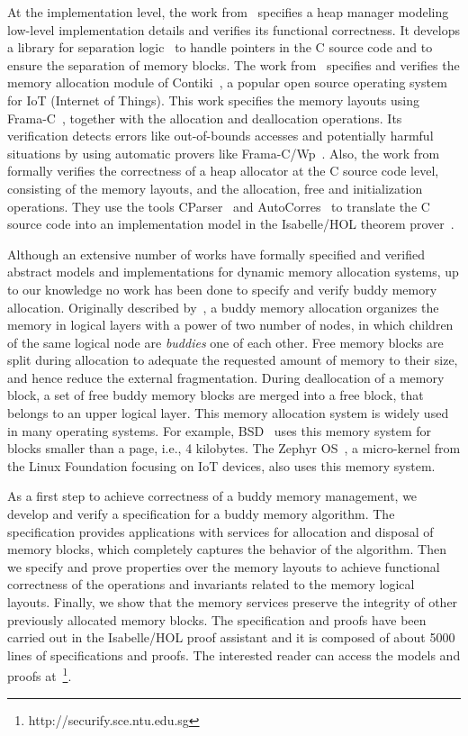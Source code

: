 At the implementation level, the work from~\cite{reg_marti} specifies a heap manager modeling low-level implementation details and verifies its functional correctness. It develops a library for separation logic~\cite{reg_reynolds} to handle pointers in the C source code and to ensure the separation of memory blocks. The work from~\cite{reg_mangano} specifies and verifies the memory allocation module of Contiki~\cite{reg_dunkers}, a popular open source operating system for IoT (Internet of Things). This work specifies the memory layouts using Frama-C~\cite{reg_kirchner}, together with the allocation and deallocation operations. Its verification detects errors like out-of-bounds accesses and potentially harmful situations by using automatic provers like Frama-C/Wp~\cite{reg_allan}. Also, the work from~\cite{reg_sahebolamri} formally verifies the correctness of a heap allocator at the C source code level, consisting of the memory layouts, and the allocation, free and initialization operations. They use the tools CParser~\cite{reg_tuch} and AutoCorres~\cite{reg_greenaway} to translate the C source code into an implementation model in the Isabelle/HOL theorem prover~\cite{reg_Isabelle/HOL}.

Although an extensive number of works have formally specified and verified abstract models and implementations for dynamic memory allocation systems, up to our knowledge no work has been done to specify and verify buddy memory allocation. Originally described by~\cite{reg_knowlton}, a buddy memory allocation organizes the memory in logical layers with a power of two number of nodes, in which children of the same logical node are \emph{buddies} one of each other. Free memory blocks are split during allocation to adequate the requested amount of memory to their size, and hence reduce the external fragmentation. During deallocation of a memory block, a set of free buddy memory blocks are merged into a free block, that belongs to an upper logical layer. This memory allocation system is widely used in many operating systems. For example, BSD~\cite{reg_mckusick} uses this memory system for blocks smaller than a page, i.e., 4 kilobytes. The Zephyr OS~\cite{reg_zephyr}, a micro-kernel from the Linux Foundation focusing on IoT devices, also uses this memory system.

As a first step to achieve correctness of a buddy memory management, we develop and verify a specification for a buddy memory algorithm. The specification provides applications with services for allocation and disposal of memory blocks, which completely captures the behavior of the algorithm. Then we specify and prove properties over the memory layouts to achieve functional correctness of the operations and invariants related to the memory logical layouts. Finally, we show that the memory services preserve the integrity of other previously allocated memory blocks. The specification and proofs have been carried out in the Isabelle/HOL proof assistant and it is composed of about 5000 lines of specifications and proofs. The interested reader can access the models and proofs at~\footnote{http://securify.sce.ntu.edu.sg}.

